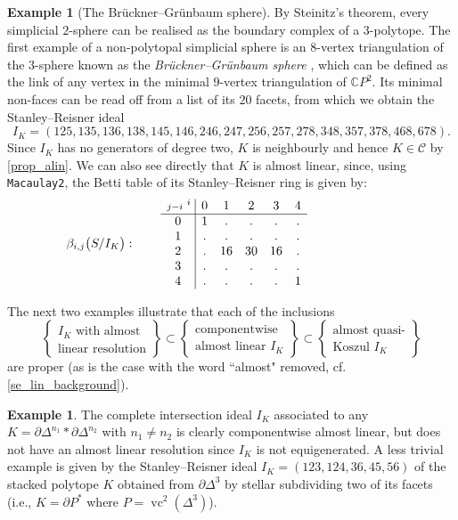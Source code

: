 \documentclass[a4paper,10pt]{amsart}
\theoremstyle{definition}
\newtheorem{example}[theorem]{Example}
\theoremstyle{remark}
\begin{document}
\begin{example}[The Br\"uckner--Gr\"unbaum sphere]
By Steinitz's theorem, every simplicial $2$-sphere can be realised as the boundary complex of a $3$-polytope. The first example of a non-polytopal simplicial sphere is an $8$-vertex triangulation of the $3$-sphere known as the \emph{Br\"uckner--Gr\"unbaum sphere} \cite{GSr}, which can be defined as the link of any vertex in the minimal $9$-vertex triangulation of $\mathbb{C}P^2$. Its minimal non-faces can be read off from a list of its $20$ facets, from which we obtain the Stanley--Reisner ideal 
\[
I_K= (125,135,136,138,145,146,246,247,256,257,278,348,357,378,468,678).
\]
Since $I_K$ has no generators of degree two, $K$ is neighbourly and hence $K\in \mathcal{C}$ by \cref{prop_alin}. We can also see directly that $K$ is almost linear, since, using {\tt Macaulay2}, the  Betti table of its Stanley--Reisner ring is given by:
         \[\beta_{i,j}\big(S/I_K\big):\qquad 
         \begin{array}{c|c c c c c}
         { \scriptstyle j-i}^{\ i}\!& 0 & 1 & 2 & 3 & 4\\ \hline

         0 & 1 & . & . & . & .\\
         1 & . & . & . & . & .\\
         2 & . & 16 & 30 & 16 & .\\
         3 & . & . & . & . & .\\
         4 & . & . & . & . & 1
\end{array}
\hspace{25mm}
\]
\end{example}

The next two examples illustrate that each of the inclusions
\[
\left\{ \substack{I_K\text{ with almost}\\ \text{linear resolution}} \right\} \subset
\left\{ \substack{\text{componentwise}\\ \text{almost linear }I_K} \right\} \subset
\left\{ \substack{\text{almost quasi-}\\ \text{Koszul }I_K} \right\}
\]
are proper (as is the case with the word ``almost" removed, cf. \cref{se_lin_background}).

\begin{example}%
The complete intersection ideal $I_K$ associated to any $K=\partial\Delta^{n_1}*\partial\Delta^{n_2}$ with $n_1\neq n_2$ is clearly componentwise almost linear, but does not have an almost linear resolution since $I_K$ is not equigenerated. A less trivial example is given by the Stanley--Reisner ideal $I_K=(123,124,36,45,56)$
of the stacked polytope $K$ obtained from $\partial\Delta^3$ by stellar subdividing two of its facets (i.e., $K=\partial P^*$ where $P=\operatorname{vc}^2(\Delta^3)$). 
\end{example}
\end{document}
